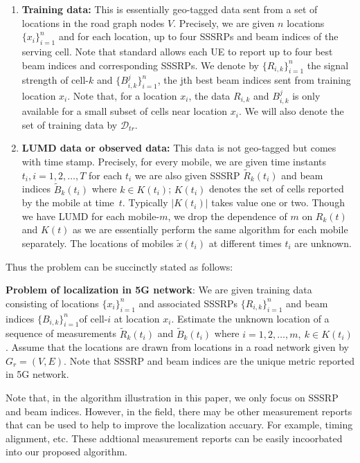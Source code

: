 \documentclass[conference, 10pt]{IEEEtran}
\newcommand{\abs}[1]{\lvert #1 \rvert}
\newcommand{\card}[1]{\abs{#1}}
\begin{document}
\begin{enumerate}

\item \textbf{Training data:} This is essentially geo-tagged data sent from
a set of locations in the road graph nodes $V$. Precisely, we are given $n$ locations
$\{x_i\}_{i=1}^n$ and for each location, up to four SSSRPs and beam indices of
the serving cell. Note that standard allows each UE to report up to four best beam indices and corresponding SSSRPs.
We denote by $\{R_{i,k}\}_{i=1}^n$ the signal
strength of cell-$k$ and $\{B^{j}_{i,k}\}_{i=1}^n$, the jth best beam indices sent from training location $x_i$. Note
that, for a location $x_i$, the data $R_{i,k}$  and $B^j_{i,k}$ is only available
for a small subset of cells near location $x_i$. We will also denote the set of
training data by $\mathcal{D}_{tr}$.

\item \textbf{LUMD data or observed data:} This data is not geo-tagged but comes
with time stamp. Precisely, for every mobile, we are given time instants
$t_i, i=1,2,\hdots,T$ for each $t_i$ we are also given SSSRP
${\tilde{R}}_k(t_i)$ and beam indices ${\tilde{B}}_k(t_i)$ where $k\in K(t_i)$; $K(t_i)$ denotes the set of cells reported by
the mobile at time~$t$. Typically $\card{K(t_i)}$ takes value one or two.
Though we have LUMD for each mobile-$m$, we drop the dependence of $m$
on $R_k(t)$ and $K(t)$ as we are essentially perform the same algorithm
for each mobile separately. The locations of mobiles $\tilde{x}(t_i)$ at different
times $t_i$ are unknown.
	
\end{enumerate} 

Thus the problem can be succinctly stated as follows:

 {\bf Problem of localization in 5G network}: We are given training data consisting
of locations $\{x_i\}_{i=1}^n$ and associated SSSRPs  $\{R_{i,k}\}_{i=1}^n$ and beam indices $\{B_{i,k}\}_{i=1}^n$of
cell-$i$ at location $x_i$. Estimate the unknown location of a sequence of measurements
${\tilde{R}}_k(t_i)$ and ${\tilde{B}}_k(t_i)$ where $i=1,2,\hdots,m,\ k\in K(t_i)$. Assume that the locations
are drawn from locations in a road network given by $G_r=(V,E)$. Note that SSSRP and beam indices are the unique metric reported
in 5G network.

Note that, in the algorithm illustration in this paper, we only focus on SSSRP and beam indices. However, in the field, there may be other measurement reports that 
can be used to help to improve the localization accuary. For example, timing alignment, etc. These addtional measurement reports can be easily incoorbated into our proposed algorithm.
\end{document}
